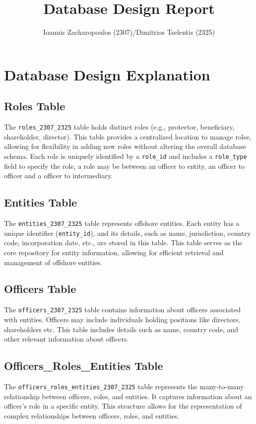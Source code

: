 \documentclass{article}
\title{Database Design Report}
\author{Ioannis Zacharopoulos (2307)/Dimitrios Tselentis (2325)}
\begin{document}
\maketitle

\section*{\centering Database Design Explanation}


\subsection*{Roles Table}
The \texttt{roles\_2307\_2325} table holds distinct roles (e.g., protector, beneficiary, shareholder, director). This table provides a centralized location to manage roles, allowing for flexibility in adding new roles without altering the overall database schema. Each role is uniquely identified by a \texttt{role\_id} and includes a \texttt{role\_type} field to specify the role, a role may be between an officer to entity, an officer to officer and a officer to intermediary.

\subsection*{Entities Table}
The \texttt{entities\_2307\_2325} table represents offshore entities. Each entity has a unique identifier (\texttt{entity\_id}), and its details, such as name, jurisdiction, country code, incorporation date, etc., are stored in this table. This table serves as the core repository for entity information, allowing for efficient retrieval and management of offshore entities.

\subsection*{Officers Table}
The \texttt{officers\_2307\_2325} table contains information about officers associated with entities. Officers may include individuals holding positions like directors, shareholders etc. This table includes details such as name, country code, and other relevant information about officers.

\subsection*{Officers\_Roles\_Entities Table}
The \texttt{officers\_roles\_entities\_2307\_2325} table represents the many-to-many relationship between officers, roles, and entities. It captures information about an officer's role in a specific entity. This structure allows for the representation of complex relationships between officers, roles, and entities.
\end{document}
